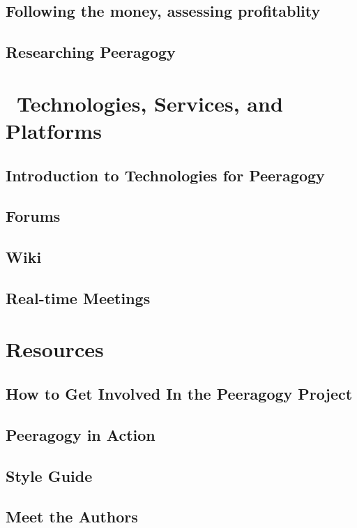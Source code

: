 \documentclass[ebook, 12pt, twoside]{memoir}
\begin{document}
\chapter[\textbf{Following the money}]{ Following the money, assessing profitablity}
%

%
\chapter[\textbf{Researching Peeragogy}]{Researching Peeragogy}
%



\part{~Technologies, Services, and Platforms } %
%
\chapter[\textbf{Peeragogy Technology}]{Introduction to Technologies for Peeragogy}

%
\chapter[\textbf{Forums}]{ Forums } 
%

%
\chapter[\textbf{Wiki}]{ Wiki } 
%

%
\chapter[\textbf{Real-time Meetings}]{ Real-time Meetings } 
%



\part{Resources} %
%
\chapter[\textbf{How to get involved}]{ How to Get Involved In the Peeragogy Project } 
%

%
\chapter[\textbf{Peeragogy in Action}]{Peeragogy in Action}
%

%
\chapter[\textbf{Style Guide}]{Style Guide}
%

%
\chapter[\textbf{Meet the Authors}]{Meet the Authors}
%

%
%
\newpage
\thispagestyle{empty}

%
\end{document}
